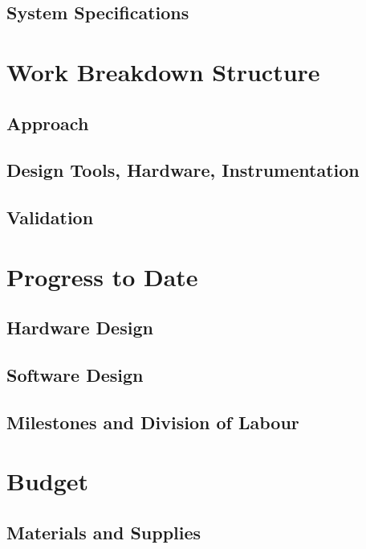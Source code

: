\documentclass[letterpaper,12pt]{article}
\begin{document}
\subsection{System Specifications} %

\section{Work Breakdown Structure} %
\subsection{Approach} 
\subsection{Design Tools, Hardware, Instrumentation}
\subsection{Validation}

\section{Progress to Date} %
\subsection{Hardware Design}
\subsection{Software Design}
\subsection{Milestones and Division of Labour}
\section{Budget} %
\subsection{Materials and Supplies}
\end{document}
